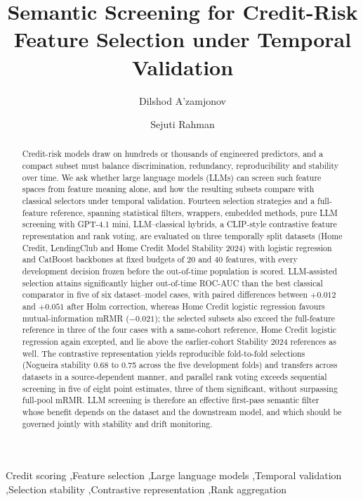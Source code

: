 \documentclass[final,5p,twocolumn]{elsarticle}
\begin{document}
\begin{frontmatter}

\title{Semantic Screening for Credit-Risk Feature Selection under Temporal Validation}

\author[aff1]{Dilshod A'zamjonov}

\author[aff2]{Sejuti Rahman}


\address[aff1]{Department of Engineering, New Uzbekistan University, 1 Movarounnahr Street, Mirzo Ulugbek District, Tashkent, Uzbekistan}
\address[aff2]{Department of Computing, New Uzbekistan University, 1 Movarounnahr Street, Mirzo Ulugbek District, Tashkent, Uzbekistan}

\begin{abstract}
Credit-risk models draw on hundreds or thousands of engineered predictors, and a compact subset must balance discrimination, redundancy, reproducibility and stability over time. We ask whether large language models (LLMs) can screen such feature spaces from feature meaning alone, and how the resulting subsets compare with classical selectors under temporal validation. Fourteen selection strategies and a full-feature reference, spanning statistical filters, wrappers, embedded methods, pure LLM screening with GPT-4.1 mini, LLM--classical hybrids, a CLIP-style contrastive feature representation and rank voting, are evaluated on three temporally split datasets (Home Credit, LendingClub and Home Credit Model Stability 2024) with logistic regression and CatBoost backbones at fixed budgets of 20 and 40 features, with every development decision frozen before the out-of-time population is scored. LLM-assisted selection attains significantly higher out-of-time ROC-AUC than the best classical comparator in five of six dataset--model cases, with paired differences between $+0.012$ and $+0.051$ after Holm correction, whereas Home Credit logistic regression favours mutual-information mRMR ($-0.021$); the selected subsets also exceed the full-feature reference in three of the four cases with a same-cohort reference, Home Credit logistic regression again excepted, and lie above the earlier-cohort Stability 2024 references as well. The contrastive representation yields reproducible fold-to-fold selections (Nogueira stability 0.68 to 0.75 across the five development folds) and transfers across datasets in a source-dependent manner, and parallel rank voting exceeds sequential screening in five of eight point estimates, three of them significant, without surpassing full-pool mRMR. LLM screening is therefore an effective first-pass semantic filter whose benefit depends on the dataset and the downstream model, and which should be governed jointly with stability and drift monitoring.
\end{abstract}

\begin{keyword}
Credit scoring \sep Feature selection \sep Large language models \sep Temporal validation \sep Selection stability \sep Contrastive representation \sep Rank aggregation
\end{keyword}

\end{frontmatter}
\end{document}
